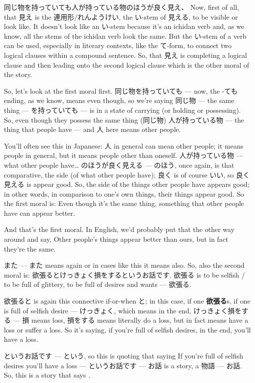 同じ物を持っていても人が持っている物のほうが良く見え、 Now, first of all, that 見え is the 連用形/れんようけい, the い-stem of 見える, to be visible or look like. It doesn't look like an い-stem because it's an ichidan verb and, as we know, all the stems of the ichidan verb look the same. But the い-stem of a verb can be used, especially in literary contexts, like the て-form, to connect two logical clauses within a compound sentence. So, that 見え is completing a logical clause and then leading onto the second logical clause which is the other moral of the story.

So, let's look at the first moral first. 同じ物を持っていても --- now, the -ても ending, as we know, means even though, so we're saying 同じ物 --- the same thing --- を持っていても --- is in a state of carrying (or holding or possessing). So, even though they possess the same thing (同じ物) 人が持っている物 --- the thing that people have --- and 人 here means other people.

You'll often see this in Japanese: 人 in general can mean other people; it means people in general, but it means people other than oneself. 人が持っている物 --- what other people have\ldots{} のほうが良く見える --- のほう, once again, is that comparative, the side (of what other people have); 良く is of course いい, so 良く見える is appear good. So, the side of the things other people have appears good; in other words, in comparison to one's own things, their things appear good. So the first moral is: Even though it's the same thing, something that other people have can appear better.

And that's the first moral. In English, we'd probably put that the other way around and say, Other people's things appear better than ours, but in fact they're the same.

\thinrule

また --- また means again or in cases like this it means also. So, also the second moral is: 欲張るとけっきょく損をするというお話です. 欲張る is to be selfish / to be full of glittery, to be full of desires and wants --- 欲張る.

欲張ると is again this connective if-or-when と; in this case, if one {\bf 欲張る}s, if one is full of selfish desire --- けっきょく, which means in the end, けっきょく損をする --- 損 means loss, 損をする means literally do a loss, but in fact means have a loss or suffer a loss. So it's saying, if you're full of selfish desires, in the end, you'll have a loss.

というお話です --- という, so this is quoting that saying If you're full of selfish desires you'll have a loss --- というお話です --- お話 is a story, a 物語 --- お話. So, this is a story that says .


